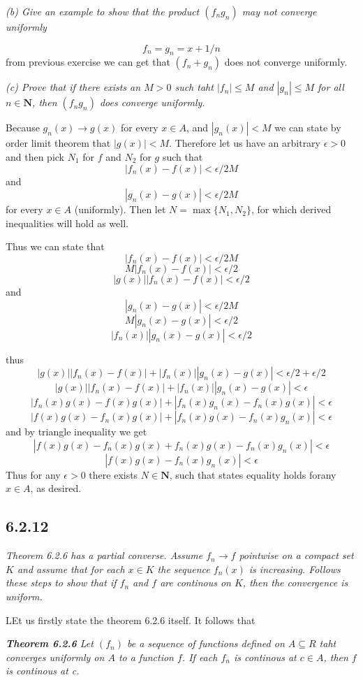 \documentclass[11pt,oneside,titlepage]{book}
\begin{document}
\textit{(b) Give an example to show that the product $(f_n g_n)$ may not
  converge uniformly}

$$f_n = g_n = x + 1/n$$
from previous exercise we can get that $(f_n + g_n)$ does not converge
uniformly.

\textit{(c) Prove that if there exists an $M > 0$ such taht $|f_n| \leq M$
  and $|g_n| \leq M$ for all $n \in \textbf{N}$, then $(f_n g_n)$
  does converge uniformly.}

Because $g_n(x) \to g(x)$ for every $x \in A$, and
$|g_n(x)| < M $ we can state by order limit theorem that $|g(x)| < M$.
Therefore let us have an arbitrary $\epsilon > 0$ and then pick
$N_1$ for $f$ and $N_2$ for $g$ such that
$$|f_n(x) - f(x)| < \epsilon/2M$$
and
$$|g_n(x) - g(x)| < \epsilon/2M$$
for every $x \in A$ (uniformly). Then let $N = \max\{N_1, N_2\}$, for
which derived inequalities will hold as well.

Thus we can state that
$$|f_n(x) - f(x)| < \epsilon/2M$$
$$M|f_n(x) - f(x)| < \epsilon/2$$
$$|g(x)||f_n(x) - f(x)| < \epsilon/2$$
and
$$|g_n(x) - g(x)| < \epsilon/2M$$
$$M|g_n(x) - g(x)| < \epsilon/2$$
$$|f_n(x)||g_n(x) - g(x)| < \epsilon/2$$

thus
$$|g(x)||f_n(x) - f(x)| + |f_n(x)||g_n(x) - g(x)| < \epsilon/2 + \epsilon/2$$
$$|g(x)||f_n(x) - f(x)| + |f_n(x)||g_n(x) - g(x)| < \epsilon$$
$$|f_n(x)g(x) - f(x)g(x)| + |f_n(x)g_n(x) - f_n(x)g(x)| < \epsilon$$
$$|f(x)g(x) - f_n(x)g(x)| + | f_n(x)g(x) - f_n(x)g_n(x)| < \epsilon$$
and by triangle inequality we get
$$|f(x)g(x) - f_n(x)g(x) + f_n(x)g(x) - f_n(x)g_n(x)| < \epsilon$$
$$|f(x)g(x)  - f_n(x)g_n(x)| < \epsilon$$
Thus for any $\epsilon > 0$ there exists $N \in \textbf{N}$, such that
states equality holds forany $x \in A$, as desired.

\subsection*{6.2.12}
\textit{Theorem 6.2.6 has a partial converse. Assume $f_n \to f$ pointwise on
  a compact set $K$ and assume that for each $x \in K$ the sequence $f_n(x)$
  is increasing. Follows these steps to show that if $f_n$ and $f$ are
  continous on $K$, then the convergence is uniform.}

LEt us firstly state the theorem 6.2.6 itself. It follows that

\textit{\textbf{Theorem 6.2.6} Let $(f_n)$ be a sequence of functions defined
  on $A \subseteq R$ taht converges uniformly on $A$ to a function $f$. If
  each $f_n$ is continous at $c \in A$, then $f$ is continous at c.}
\end{document}
